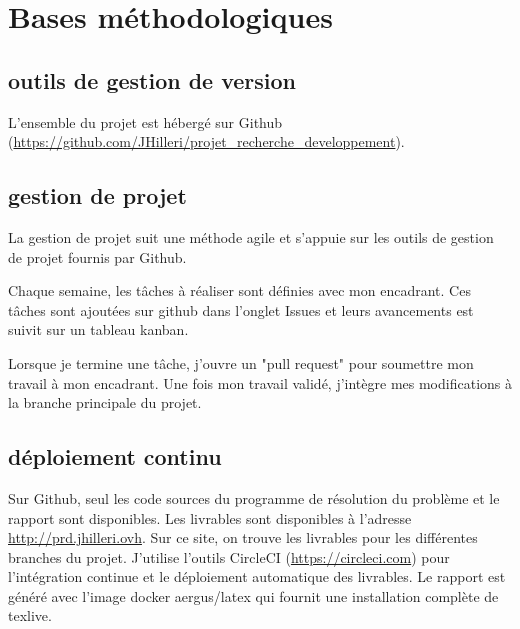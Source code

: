\section{Bases méthodologiques}
\subsection{outils de gestion de version}
L'ensemble du projet est hébergé sur Github (\url{https://github.com/JHilleri/projet_recherche_developpement}).

\subsection{gestion de projet}
La gestion de projet suit une méthode agile et s'appuie sur les outils de gestion de projet fournis par Github.

Chaque semaine, les tâches à réaliser sont définies avec mon encadrant.
Ces tâches sont ajoutées sur github dans l'onglet Issues et leurs avancements est suivit sur un tableau kanban.

Lorsque je termine une tâche, j'ouvre un "pull request" pour soumettre mon travail à mon encadrant.
Une fois mon travail validé, j'intègre mes modifications à la branche principale du projet.

\subsection{déploiement continu}
Sur Github, seul les code sources du programme de résolution du problème et le rapport sont disponibles.
Les livrables sont disponibles à l'adresse \url{http://prd.jhilleri.ovh}.
Sur ce site, on trouve les livrables pour les différentes branches du projet.
J'utilise l'outils CircleCI (\url{https://circleci.com}) pour l'intégration continue 
    et le déploiement automatique des livrables.
Le rapport est généré avec l'image docker aergus/latex qui fournit une installation complète de texlive.
